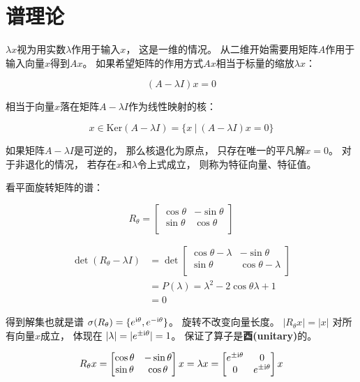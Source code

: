 \documentclass[10pt, openany]{book}
\begin{document}
\chapter{谱理论}

$\lambda x$视为用实数$\lambda$作用于输入$x$，
这是一维的情况。
从二维开始需要用矩阵$A$作用于输入向量$x$得到$Ax$。
如果希望矩阵的作用方式$Ax$相当于标量的缩放$\lambda x$：

$$
(A - \lambda I)x = 0
$$

相当于向量$x$落在矩阵$A - \lambda I$作为线性映射的核：

$$
x\in\text{Ker}(A - \lambda I) 
= \{x \ | \ (A - \lambda I)x = 0\}
$$

如果矩阵$A - \lambda I$是可逆的，
那么核退化为原点，
只存在唯一的平凡解$x=0$。
对于非退化的情况，
若存在$x$和$\lambda$令上式成立，
则称为特征向量、特征值。

看平面旋转矩阵的谱：

$$
R_\theta = \begin{bmatrix}
  \cos\theta & -\sin\theta \\
  \sin\theta & \cos\theta \\
\end{bmatrix}
$$

$$
\begin{aligned}
\det (R_\theta - \lambda I)
&=\det \begin{bmatrix}
  \cos\theta - \lambda & -\sin\theta \\
  \sin\theta & \cos\theta -\lambda \\
\end{bmatrix} \\
&=P(\lambda)
=\lambda^2 - 2\cos\theta \lambda + 1 \\
&=0
\end{aligned}
$$

得到解集也就是谱
$\sigma(R_\theta) = \{ e^{\text i\theta},e^{-\text i\theta} \}$。
旋转不改变向量长度。
$|R_\theta x| = |x|$
对所有向量$x$成立，
体现在
$|\lambda| = |e^{\pm\text i\theta}| = 1$。
保证了算子是\textbf{酉(unitary)}的。

$$
R_\theta x = \begin{bmatrix}
  \cos\theta & -\sin\theta \\
  \sin\theta & \cos\theta \\
\end{bmatrix}x
= \lambda x
= \begin{bmatrix}
  e^{\pm\text i\theta} & 0 \\
  0 & e^{\pm\text i\theta} \\
\end{bmatrix}x
$$
\end{document}
